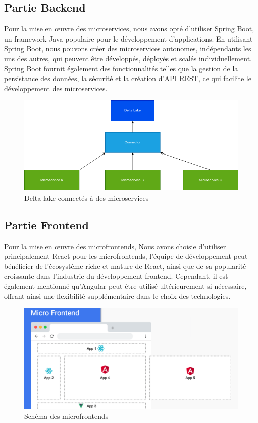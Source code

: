 \subsection{Partie Backend}
Pour la mise en œuvre des microservices, nous avons opté d'utiliser Spring Boot, un framework Java populaire pour le développement d'applications. En utilisant Spring Boot, nous pouvons créer des microservices autonomes, indépendants les uns des autres, qui peuvent être développés, déployés et scalés individuellement. Spring Boot fournit également des fonctionnalités telles que la gestion de la persistance des données, la sécurité et la création d'API REST, ce qui facilite le développement des microservices.

\begin{figure}[H]
\centering
\includegraphics[width=\linewidth]{images/delta-lake-microservices.png}
\caption{Delta lake connectés à des microservices}\label{fig:schema-delta}
\end{figure}

\subsection{Partie Frontend}
Pour la mise en œuvre des microfrontends, Nous avons choisie d'utiliser principalement React pour les microfrontends, l'équipe de développement peut bénéficier de l'écosystème riche et mature de React, ainsi que de sa popularité croissante dans l'industrie du développement frontend. Cependant, il est également mentionné qu'Angular peut être utilisé ultérieurement si nécessaire, offrant ainsi une flexibilité supplémentaire dans le choix des technologies.

\begin{figure}[H]
\centering
\includegraphics[width=\linewidth]{images/microfrontends.png}
\caption{Schéma des microfrontends}\label{fig:schema-microfrontends}
\end{figure}

